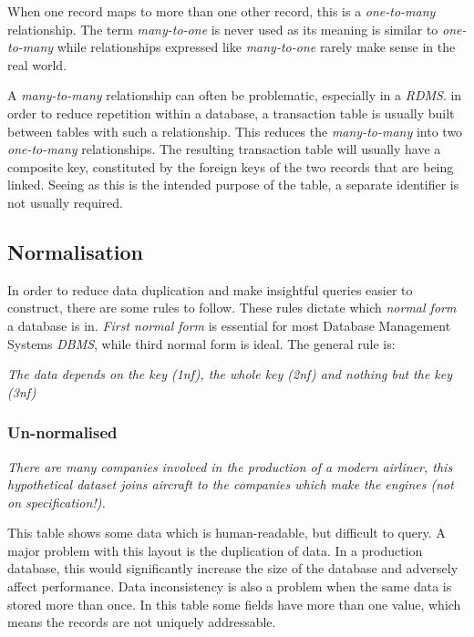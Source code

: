 \documentclass[10pt]{article}
\begin{document}
When one record maps to more than one other record, this is a \emph{one-to-many} relationship. The term \emph{many-to-one} is never used as its meaning is similar to \emph{one-to-many} while relationships expressed like \emph{many-to-one} rarely make sense in the real world.

A \emph{many-to-many} relationship can often be problematic, especially in a \emph{RDMS}. in order to reduce repetition within a database, a transaction table is usually built between tables with such a relationship. This reduces the \emph{many-to-many} into two \emph{one-to-many} relationships. The resulting transaction table will usually have a composite key, constituted by the foreign keys of the two records that are being linked. Seeing as this is the intended purpose of the table, a separate identifier is not usually required.

\subsection{Normalisation}
\label{sec:org258c36c}

In order to reduce data duplication and make insightful queries easier to construct, there are some rules to follow. These rules dictate which \emph{normal form} a database is in. \emph{First normal form} is essential for most Database Management Systems \emph{DBMS}, while third normal form is ideal. The general rule is:

\emph{The data depends on the key (1nf), the whole key (2nf) and nothing but the key (3nf)}

\subsubsection{Un-normalised}
\label{sec:org1a8d45d}

\emph{There are many companies involved in the production of a modern airliner, this hypothetical dataset joins aircraft to the companies which make the engines (not on specification!).}

This table shows some data which is human-readable, but difficult to query. A major problem with this layout is the duplication of data. In a production database, this would significantly increase the size of the database and adversely affect performance. Data inconsistency is also a problem when the same data is stored more than once. In this table some fields have more than one value, which means the records are not uniquely addressable.
\end{document}
